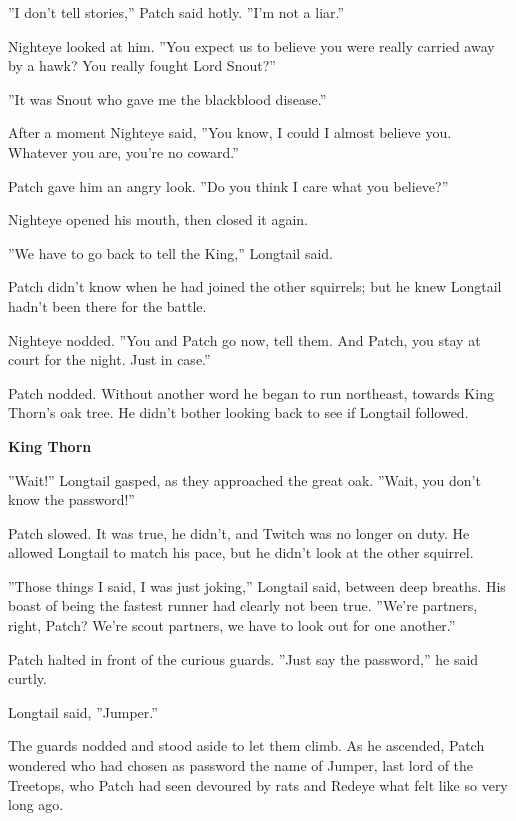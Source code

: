 \documentclass[11pt]{article}
\begin{document}
 ''I don't tell stories,'' Patch said hotly. ''I'm not a liar.''\par
 Nighteye looked at him. ''You expect us to believe you were really carried away by a hawk? You really fought Lord Snout?''\par
 ''It was Snout who gave me the blackblood disease.''\par
 After a moment Nighteye said, ''You know, I could I almost believe you. Whatever you are, you're no coward.''\par
 Patch gave him an angry look. ''Do you think I care what you believe?''\par
 Nighteye opened his mouth, then closed it again.\par
 ''We have to go back to tell the King,'' Longtail said.\par
 Patch didn't know when he had joined the other squirrels; but he knew Longtail hadn't been there for the battle.\par
 Nighteye nodded. ''You and Patch go now, tell them. And Patch, you stay at court for the night. Just in case.''\par
 Patch nodded. Without another word he began to run northeast, towards King Thorn's oak tree. He didn't bother looking back to see if Longtail followed.\par
\par
{\bf King Thorn\par
}\par
 ''Wait!'' Longtail gasped, as they approached the great oak. ''Wait, you don't know the password!''\par
 Patch slowed. It was true, he didn't, and Twitch was no longer on duty. He allowed Longtail to match his pace, but he didn't look at the other squirrel.\par
 ''Those things I said, I was just joking,'' Longtail said, between deep breaths. His boast of being the fastest runner had clearly not been true. ''We're partners, right, Patch? We're scout partners, we have to look out for one another.''\par
 Patch halted in front of the curious guards. ''Just say the password,'' he said curtly.\par
 Longtail said, ''Jumper.''\par
 The guards nodded and stood aside to let them climb. As he ascended, Patch wondered who had chosen as password the name of Jumper, last lord of the Treetops, who Patch had seen devoured by rats and Redeye what felt like so very long ago.\par
\end{document}
